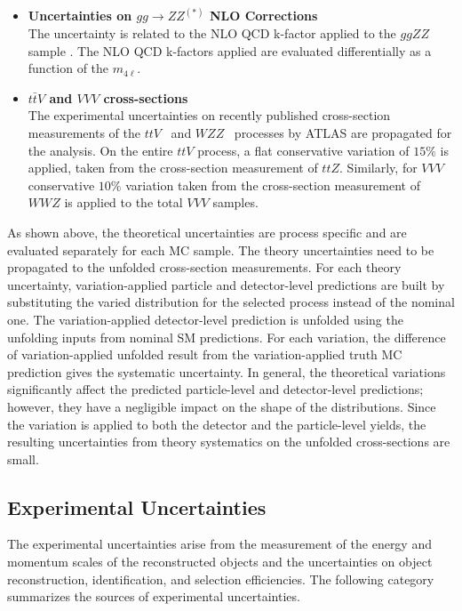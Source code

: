 \begin{itemize}
\item{\textbf{Uncertainties on $gg\rightarrow ZZ^{(\ast)}$ NLO Corrections}\\
The uncertainty is related to the NLO QCD k-factor applied to the $ggZZ$ sample \cite{ggZZNLOUnc}. The NLO QCD k-factors applied are evaluated differentially as a function of the $m_{4\ell}$. 
}

\item{\textbf{$t\bar{t}V$ and $VVV$ cross-sections}\\
The experimental uncertainties on recently published cross-section measurements of the $ttV$~\cite{ATLAS_ttV} and $WZZ$~\cite{ATLAS_VVV} processes by ATLAS are propagated for the analysis. On the entire $ttV$ process, a flat conservative variation of $15\%$ is applied, taken from the cross-section measurement of $ttZ$. Similarly, for $VVV$ conservative $10\%$ variation taken from the cross-section measurement of $WWZ$ is applied to the total $VVV$ samples.
}

\end{itemize}

As shown above, the theoretical uncertainties are process specific and are evaluated separately for each MC sample. The theory uncertainties need to be propagated to the unfolded cross-section measurements. For each theory uncertainty, variation-applied particle and detector-level predictions are built by substituting the varied distribution for the selected process instead of the nominal one. The variation-applied detector-level prediction is unfolded using the unfolding inputs from nominal SM predictions. For each variation, the difference of variation-applied unfolded result from the variation-applied truth MC prediction gives the systematic uncertainty. In general, the theoretical variations significantly affect the predicted particle-level and detector-level predictions; however, they have a negligible impact on the shape of the distributions. Since the variation is applied to both the detector and the particle-level yields, the resulting uncertainties from theory systematics on the unfolded cross-sections are small.

\subsection{Experimental Uncertainties}
\label{subsec:ExpUnc}
The experimental uncertainties arise from the measurement of the energy and momentum scales of the reconstructed objects and the uncertainties on object reconstruction, identification, and selection efficiencies. The following category summarizes the sources of experimental uncertainties.

